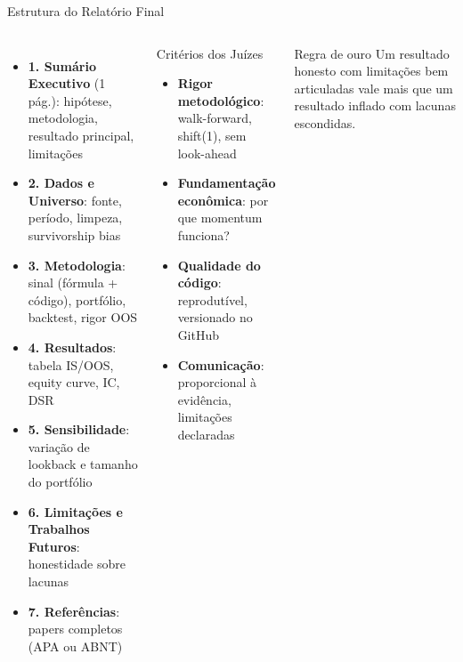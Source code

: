 \documentclass[aspectratio=169,12pt]{beamer}
\begin{document}
\begin{frame}[fragile]{Estrutura do Relatório Final}
\begin{columns}[T]
\begin{itemize}
  \item \textbf{1. Sumário Executivo} (1 pág.): hipótese, metodologia, resultado principal, limitações
  \item \textbf{2. Dados e Universo}: fonte, período, limpeza, survivorship bias
  \item \textbf{3. Metodologia}: sinal (fórmula + código), portfólio, backtest, rigor OOS
  \item \textbf{4. Resultados}: tabela IS/OOS, equity curve, IC, DSR
  \item \textbf{5. Sensibilidade}: variação de lookback e tamanho do portfólio
  \item \textbf{6. Limitações e Trabalhos Futuros}: honestidade sobre lacunas
  \item \textbf{7. Referências}: papers completos (APA ou ABNT)
\end{itemize}
\begin{block}{Critérios dos Juízes}
\begin{itemize}
  \item \textbf{Rigor metodológico}: walk-forward, shift(1), sem look-ahead
  \item \textbf{Fundamentação econômica}: por que momentum funciona?
  \item \textbf{Qualidade do código}: reprodutível, versionado no GitHub
  \item \textbf{Comunicação}: proporcional à evidência, limitações declaradas
\end{itemize}
\end{block}\vspace{.3em}
\begin{alertblock}{Regra de ouro}
Um resultado honesto com limitações bem articuladas vale mais que um resultado inflado com lacunas escondidas.
\end{alertblock}
\end{columns}
\end{frame}
\end{document}
